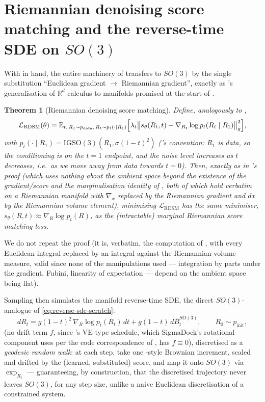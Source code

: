 \documentclass[11pt,a4paper]{report}
\newtheorem{theorem}{Theorem}[chapter]
\theoremstyle{definition}
\theoremstyle{remark}
\newcommand{\RR}{\mathbb R}
\newcommand{\EE}{\mathbb E}
\begin{document}
\section{Riemannian denoising score matching and the reverse-time SDE on $SO(3)$}
\label{sec:diff-so3}

With  in hand, the entire machinery of
 transfers to $SO(3)$ by the single substitution
``Euclidean gradient $\to$ Riemannian gradient'', exactly as
's generalisation of $\RR^d$ calculus to
manifolds promised at the start of .

\begin{theorem}[Riemannian denoising score matching]
\label{thm:rdsm-scratch}
Define, analogously to ,
\[
\mathcal L_{\mathrm{RDSM}}(\theta)
=
\EE_{t,\,R_1\sim p_{\mathrm{data}},\,R_t\sim p_t(\cdot\mid R_1)}
\Bigl[\lambda_t\bigl\|s_\theta(R_t,t) - \nabla_{R_t}\log p_t(R_t\mid R_1)\bigr\|_g^2\Bigr],
\]
with $p_t(\cdot\mid R_1) = \mathrm{IGSO}(3)(R_1,\sigma(1-t)^2)$
('s convention: $R_1$ is data, so the
conditioning is on the $t=1$ endpoint, and the noise level increases as $t$
decreases, i.e.\ as we move away from data towards $t=0$). Then, exactly as
in 's proof (which uses nothing about the ambient
space beyond the existence of the gradient/score and the marginalisation
identity of , both of which hold verbatim on a
Riemannian manifold with $\nabla_x$ replaced by the Riemannian gradient and
$dx$ by the Riemannian volume element), minimising
$\mathcal L_{\mathrm{RDSM}}$ has the same minimiser,
$s_\theta(R,t)\approx\nabla_R\log p_t(R)$, as the (intractable) marginal
Riemannian score matching loss.
\end{theorem}

We do not repeat the proof (it is, verbatim, the computation of
, with every Euclidean integral replaced by an
integral against the Riemannian volume measure, valid since none of the
manipulations used --- integration by parts under the gradient, Fubini,
linearity of expectation --- depend on the ambient space being flat).

Sampling then simulates the manifold reverse-time SDE, the direct
$SO(3)$-analogue of \eqref{eq:reverse-sde-scratch}:
\begin{equation}
\label{eq:reverse-so3-scratch}
dR_t = g(1-t)^2\,\nabla_R\log p_t(R_t)\,dt + g(1-t)\,d\overline B_t^{SO(3)},
\qquad R_0\sim p_{\mathrm{init}} ,
\end{equation}
(no drift term $f$, since 's VE-type schedule, which
SigmaDock's rotational component uses per the code correspondence of
, has $f\equiv0$), discretised as a
\emph{geodesic random walk}: at each step, take one
-style Brownian increment, scaled and drifted
by the (learned, substituted) score, and map it onto $SO(3)$ via
$\exp_{R_t}$ --- guaranteeing, by construction, that the discretised
trajectory never leaves $SO(3)$, for any step size, unlike a naive
Euclidean discretisation of a constrained system.
\end{document}
